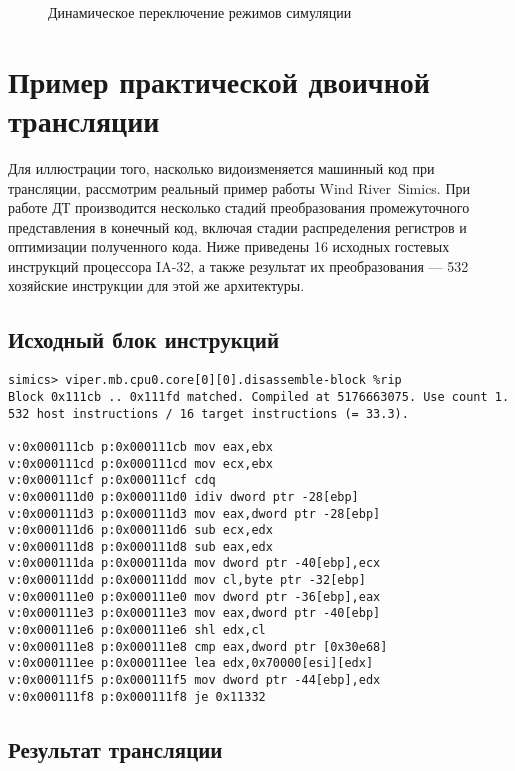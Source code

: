\begin{figure}[htb]
    \centering
    \caption[Динамическое переключение режимов симуляции]{Динамическое переключение режимов симуляции}
    \label{fig:gearbox}
\end{figure}


\section[Пример практической двоичной трансляции]{Пример практической двоичной трансляции}

Для иллюстрации того, насколько видоизменяется машинный код при трансляции, рассмотрим реальный пример работы Wind River\textregistered~Simics. При работе ДТ производится несколько стадий преобразования промежуточного представления в конечный код, включая стадии распределения регистров и оптимизации полученного кода. Ниже приведены 16 исходных гостевых инструкций процессора IA-32, а также результат их преобразования --- 532 хозяйские инструкции для этой же архитектуры.

\subsection{Исходный блок инструкций}

\begin{lstlisting}
simics> viper.mb.cpu0.core[0][0].disassemble-block %rip
Block 0x111cb .. 0x111fd matched. Compiled at 5176663075. Use count 1.
532 host instructions / 16 target instructions (= 33.3).

v:0x000111cb p:0x000111cb mov eax,ebx
v:0x000111cd p:0x000111cd mov ecx,ebx
v:0x000111cf p:0x000111cf cdq
v:0x000111d0 p:0x000111d0 idiv dword ptr -28[ebp]
v:0x000111d3 p:0x000111d3 mov eax,dword ptr -28[ebp]
v:0x000111d6 p:0x000111d6 sub ecx,edx
v:0x000111d8 p:0x000111d8 sub eax,edx
v:0x000111da p:0x000111da mov dword ptr -40[ebp],ecx
v:0x000111dd p:0x000111dd mov cl,byte ptr -32[ebp]
v:0x000111e0 p:0x000111e0 mov dword ptr -36[ebp],eax
v:0x000111e3 p:0x000111e3 mov eax,dword ptr -40[ebp]
v:0x000111e6 p:0x000111e6 shl edx,cl
v:0x000111e8 p:0x000111e8 cmp eax,dword ptr [0x30e68]
v:0x000111ee p:0x000111ee lea edx,0x70000[esi][edx]
v:0x000111f5 p:0x000111f5 mov dword ptr -44[ebp],edx
v:0x000111f8 p:0x000111f8 je 0x11332
\end{lstlisting}

\subsection{Результат трансляции}

